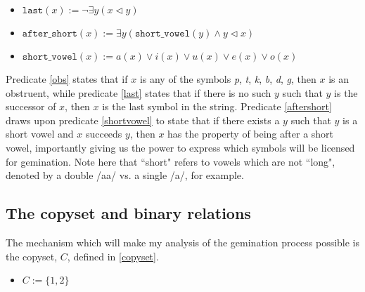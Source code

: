 \documentclass{article}
\begin{document}
\begin{exe}
    \ex
    \label{last}
    \begin{itemize}
        \item [] $\texttt{last}(x) := \neg \exists y (x \triangleleft y)$
    \end{itemize}
\end{exe}

\begin{exe}
    \ex
    \label{aftershort}
    \begin{itemize}
        \item [] $\texttt{after\_short}(x) := \exists y (\texttt{short\_vowel}(y) \wedge y \triangleleft x)$
    \end{itemize}
\end{exe}

\begin{exe}
    \ex
    \label{shortvowel}
    \begin{itemize}
        \item [] $\texttt{short\_vowel}(x) := a(x) \vee i(x) \vee u(x) \vee e(x) \vee o(x)$
    \end{itemize}
\end{exe}

Predicate \ref{obs} states that if $x$ is any of the symbols \textit{p}, \textit{t}, \textit{k}, \textit{b}, \textit{d}, \textit{g}, then $x$ is an obstruent, while predicate \ref{last} states that if there is no such $y$ such that $y$ is the successor of $x$, then $x$ is the last symbol in the string. Predicate \ref{aftershort} draws upon predicate \ref{shortvowel} to state that if there exists a $y$ such that $y$ is a short vowel and $x$ succeeds $y$, then $x$ has the property of being after a short vowel, importantly giving us the power to express which symbols will be licensed for gemination. Note here that “short" refers to vowels which are not “long", denoted by a double /aa/ vs. a single /a/, for example.

\subsection{The copyset and binary relations}
\label{copysection}
The mechanism which will make my analysis of the gemination process possible is the copyset, $C$, defined in \ref{copyset}.

\begin{exe}
    \ex
    \label{copyset}
    \begin{itemize}
        \item [] $C := \{1, 2\}$
    \end{itemize}
\end{exe}
\end{document}
